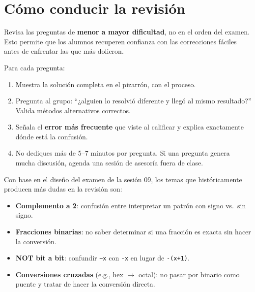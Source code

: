 \documentclass[12pt, oneside]{article}
\begin{document}
\section{Cómo conducir la revisión}
\label{sec:revision}

\begin{notaprofesor}
  Revisa las preguntas de \textbf{menor a mayor dificultad}, no en el
  orden del examen.  Esto permite que los alumnos recuperen confianza
  con las correcciones fáciles antes de enfrentar las que más dolieron.

  Para cada pregunta:
  \begin{enumerate}
    \item Muestra la solución completa en el pizarrón, con el proceso.
    \item Pregunta al grupo: ``¿alguien lo resolvió diferente y llegó al
          mismo resultado?''  Valida métodos alternativos correctos.
    \item Señala el \textbf{error más frecuente} que viste al calificar
          y explica exactamente dónde está la confusión.
    \item No dediques más de 5--7 minutos por pregunta.
          Si una pregunta genera mucha discusión, agenda una sesión de
          asesoría fuera de clase.
  \end{enumerate}
\end{notaprofesor}

\begin{notaprofesor}
  Con base en el diseño del examen de la sesión 09, los temas que
  históricamente producen más dudas en la revisión son:
  \begin{itemize}
    \item \textbf{Complemento a 2}: confusión entre interpretar un patrón
          con signo vs.\ sin signo.
    \item \textbf{Fracciones binarias}: no saber determinar si una fracción
          es exacta sin hacer la conversión.
    \item \textbf{NOT bit a bit}: confundir \texttt{\textasciitilde x}
          con \texttt{-x} en lugar de \texttt{-(x+1)}.
    \item \textbf{Conversiones cruzadas} (e.g., hex $\to$ octal): no pasar
          por binario como puente y tratar de hacer la conversión directa.
  \end{itemize}
\end{notaprofesor}
\end{document}
